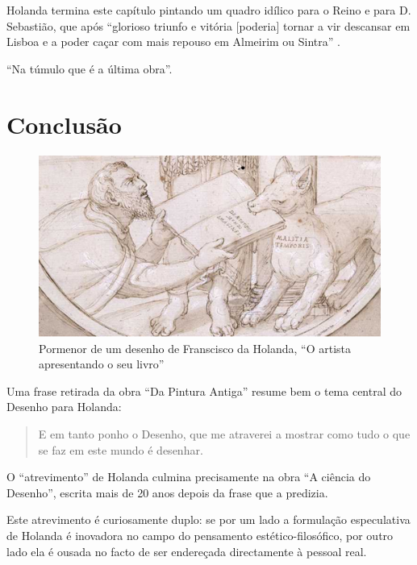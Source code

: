 \documentclass{article}
\begin{document}
Holanda termina este capítulo pintando um quadro idílico para o Reino
e para D. Sebastião, que após ``glorioso triunfo e vitória [poderia]
tornar a vir descansar em Lisboa e a poder caçar com mais repouso em
Almeirim ou Sintra'' \cite[fl.45v]{holanda}.










``Na túmulo que é a última obra''.

\section{Conclusão}

\begin{figure}
\centering\includegraphics[height=0.3\textheight,keepaspectratio]
                          {images/malatia-temporis.png}
  \caption{Pormenor de um desenho de Franscisco da Holanda, ``O
    artista apresentando o seu livro''}
  \label{fig:3}
\end{figure}

Uma frase retirada da obra ``Da Pintura Antiga'' resume bem o tema
central do Desenho para Holanda:

\begin{quote}
  E em tanto ponho o Desenho, que me atraverei a mostrar como tudo o
  que se faz em este mundo é desenhar.
\end{quote}

O ``atrevimento'' de Holanda culmina precisamente na obra ``A ciência
do Desenho'', escrita mais de 20 anos depois da frase que a predizia.

Este atrevimento é curiosamente duplo: se por um lado a formulação
especulativa de Holanda é inovadora no campo do pensamento
estético-filosófico, por outro lado ela é ousada no facto de ser
endereçada directamente à pessoal real.
\end{document}
